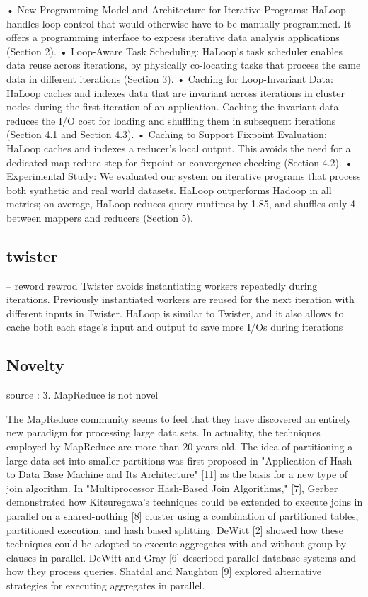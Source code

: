 \documentclass[10pt,twocolumn]{IEEEtran11}
\begin{document}
• New Programming Model and Architecture for Iterative Programs:
HaLoop handles loop control that would otherwise have
to be manually programmed. It offers a programming interface
to express iterative data analysis applications (Section 2).
• Loop-Aware Task Scheduling: HaLoop’s task scheduler enables
data reuse across iterations, by physically co-locating tasks that
process the same data in different iterations (Section 3).
• Caching for Loop-Invariant Data: HaLoop caches and indexes
data that are invariant across iterations in cluster nodes during
the first iteration of an application. Caching the invariant data
reduces the I/O cost for loading and shuffling them in subsequent
iterations (Section 4.1 and Section 4.3).
• Caching to Support Fixpoint Evaluation: HaLoop caches and
indexes a reducer’s local output. This avoids the need for a
dedicated map-reduce step for fixpoint or convergence checking
(Section 4.2).
• Experimental Study: We evaluated our system on iterative
programs that process both synthetic and real world datasets.
HaLoop outperforms Hadoop in all metrics; on average, HaLoop
reduces query runtimes by 1.85, and shuffles only 4%
between mappers and reducers (Section 5).

\subsection{twister}

-- reword rewrod
Twister avoids instantiating workers repeatedly
during iterations. Previously instantiated workers
are reused for the next iteration with different inputs
in Twister. HaLoop is similar to Twister, and it also
allows to cache both each stage’s input and output to
save more I/Os during iterations



\subsection{Novelty}

source :
3. MapReduce is not novel

The MapReduce community seems to feel that they have discovered an entirely new paradigm for processing large data sets. In actuality, the techniques employed by MapReduce are more than 20 years old. The idea of partitioning a large data set into smaller partitions was first proposed in "Application of Hash to Data Base Machine and Its Architecture" [11] as the basis for a new type of join algorithm. In "Multiprocessor Hash-Based Join Algorithms," [7], Gerber demonstrated how Kitsuregawa's techniques could be extended to execute joins in parallel on a shared-nothing [8] cluster using a combination of partitioned tables, partitioned execution, and hash based splitting. DeWitt [2] showed how these techniques could be adopted to execute aggregates with and without group by clauses in parallel. DeWitt and Gray [6] described parallel database systems and how they process queries. Shatdal and Naughton [9] explored alternative strategies for executing aggregates in parallel.   
\end{document}
